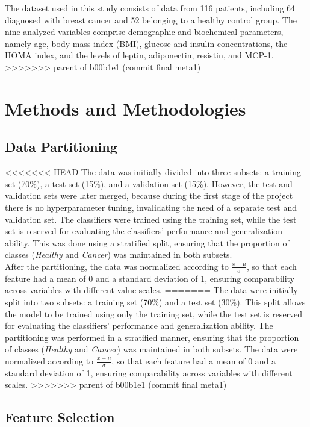 \documentclass[a4paper,12pt]{article}
\begin{document}
The dataset used in this study consists of data from 116 patients, including 64 diagnosed with breast cancer and 52 belonging to a healthy control group. The nine analyzed variables comprise demographic and biochemical parameters, namely age, body mass index (BMI), glucose and insulin concentrations, the HOMA index, and the levels of leptin, adiponectin, resistin, and MCP-1.
>>>>>>> parent of b00b1e1 (commit final meta1)

\section{Methods and Methodologies}


\subsection{Data Partitioning}

<<<<<<< HEAD
The data was initially divided into three subsets: a training set (70\%), a test set (15\%), and a validation set (15\%). However, the test and validation sets were later merged, because during the first stage of the project there is no hyperparameter tuning, invalidating the need of a separate test and validation set. The classifiers were trained using the training set, while the test set is reserved for evaluating the classifiers’ performance and generalization ability. This was done using a stratified split, ensuring that the proportion of classes (\textit{Healthy} and \textit{Cancer}) was maintained in both subsets. \\
\noindent
After the partitioning, the data was normalized according to $\frac{x - \mu}{\sigma}$, so that each feature had a mean of 0 and a standard deviation of 1, ensuring comparability across variables with different value scales.
=======
The data were initially split into two subsets: a training set (70\%) and a test set (30\%). This split allows the model to be trained using only the training set, while the test set is reserved for evaluating the classifiers’ performance and generalization ability. The partitioning was performed in a stratified manner, ensuring that the proportion of classes (\textit{Healthy} and \textit{Cancer}) was maintained in both subsets. The data were normalized according to $\frac{x - \mu}{\sigma}$, so that each feature had a mean of 0 and a standard deviation of 1, ensuring comparability across variables with different scales.
>>>>>>> parent of b00b1e1 (commit final meta1)

\subsection{Feature Selection}
\end{document}
